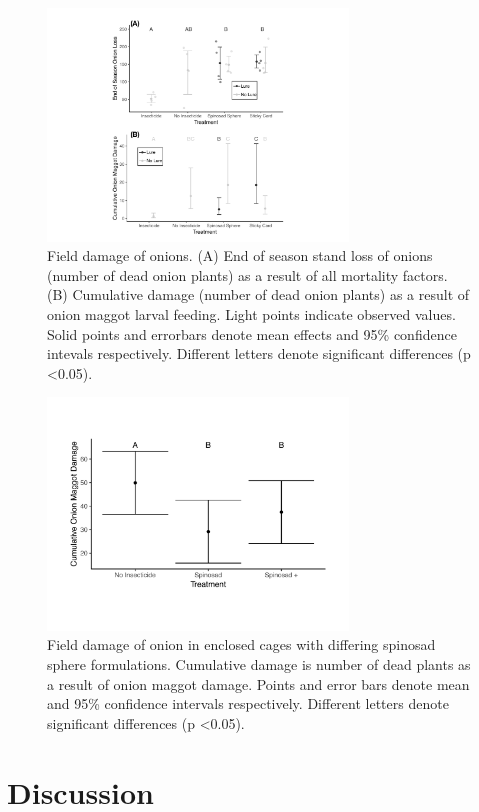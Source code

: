 \documentclass[alpha-refs]{wiley-article}
\begin{document}
\begin{figure}[bt]
\centering
\includegraphics[width = 8cm]{figures/final-figures/figure-4.pdf}
\caption{Field damage of onions.  (A) End of season stand loss of onions (number of dead onion plants) as a result of all mortality factors.  (B) Cumulative damage (number of dead onion plants) as a result of onion maggot larval feeding.  Light points indicate observed values.  Solid points and errorbars denote mean effects and 95\% confidence intevals respectively.  Different letters denote significant differences (p \textless 0.05).   }
\label{fig:figure4}
\end{figure}


\begin{figure}[bt]
\centering
\includegraphics[width = 8cm]{figures/final-figures/figure-5.pdf}
\caption{Field damage of onion in enclosed cages with differing spinosad sphere formulations.  Cumulative damage is number of dead plants as a result of onion maggot damage.  Points and error bars denote mean and 95\% confidence intervals respectively.  Different letters denote significant differences (p \textless 0.05).  }
\label{fig:figure4}
\end{figure}





\section{Discussion}
\end{document}
